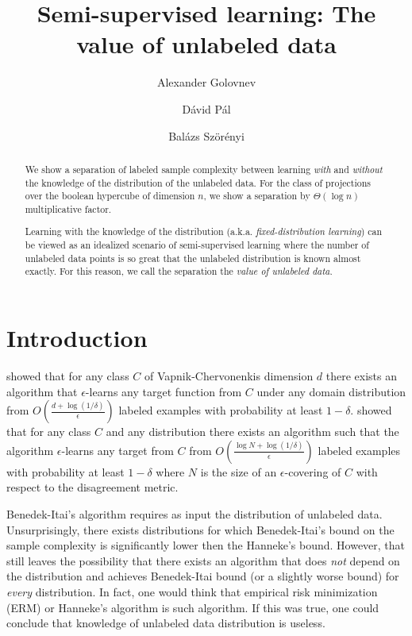 \documentclass[10pt]{article}
\begin{document}
\title{Semi-supervised learning: The value of unlabeled data}
\author{Alexander Golovnev \and D\'avid P\'al \and Bal\'azs Sz\"or\'enyi}

\maketitle

\begin{abstract}
We show a separation of labeled sample complexity between learning \emph{with}
and \emph{without} the knowledge of the distribution of the unlabeled data. For
the class of projections over the boolean hypercube of dimension $n$, we show a
separation by $\Theta(\log n)$ multiplicative factor.

Learning with the knowledge of the distribution (a.k.a. \emph{fixed-distribution
learning}) can be viewed as an idealized scenario of semi-supervised learning
where the number of unlabeled data points is so great that the unlabeled
distribution is known almost exactly. For this reason, we call the separation
the \emph{value of unlabeled data}.
\end{abstract}


\section{Introduction}

\cite{Hanneke-2016} showed that for any class $C$ of Vapnik-Chervonenkis
dimension $d$ there exists an algorithm that $\epsilon$-learns any target
function from $C$ under any domain distribution  from $O\left(\frac{d +
\log(1/\delta)}{\epsilon}\right)$ labeled examples with probability at least $1-\delta$.
\cite{Benedek-Itai-1991} showed that for any class $C$ and any distribution
there exists an algorithm such that the algorithm $\epsilon$-learns any target
from $C$ from $O \left( \frac{\log N + \log (1/\delta)}{\epsilon}\right)$
labeled examples with probability at least $1-\delta$ where $N$ is the size of
an $\epsilon$-covering of $C$ with respect to the disagreement metric.

Benedek-Itai's algorithm requires as input the distribution of unlabeled data.
Unsurprisingly, there exists distributions for which Benedek-Itai's bound on the
sample complexity is significantly lower then the Hanneke's bound. However, that
still leaves the possibility that there exists an algorithm that does \emph{not}
depend on the distribution and achieves Benedek-Itai bound (or a slightly worse
bound) for \emph{every} distribution. In fact, one would think that empirical
risk minimization (ERM) or Hanneke's algorithm is such algorithm. If this was
true, one could conclude that knowledge of unlabeled data distribution is
useless.
\end{document}
